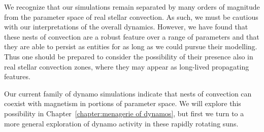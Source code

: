 We recognize that our simulations remain separated
by many orders of magnitude from the parameter space of real stellar
convection.  As such, we must be cautious with our interpretations of
the overall dynamics.  However, we have found that these nests of
convection are a robust feature over a range of parameters and that
they are able to persist as entities for as long as we could pursue their
modelling.  Thus one should be prepared to consider the possibility of
their presence also in real stellar convection zones, where they may
appear as long-lived propagating features.


Our current family of dynamo simulations indicate that nests of
convection can coexist with magnetism in portions of parameter space.
We will explore this possibility in 
Chapter~\ref{chapter:menagerie of dynamos}, but first we turn to a
more general exploration of dynamo activity in these rapidly rotating suns.



